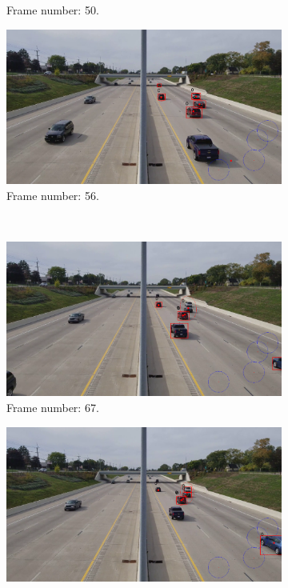 \begin{figure}[H]
\begin{subfigure}{0.48\textwidth}
        \caption{Frame number: 50.}
        \label{fig:E1-V1-S1:03}
    \end{subfigure}
    \begin{subfigure}{0.48\textwidth}
        \centering
        \includegraphics[width=\linewidth]{../../../experiments/E1/V1/YOLO/56}
        \caption{Frame number: 56.}
        \label{fig:E1-V1-S1:04}
    \end{subfigure}
    \\
    \begin{subfigure}{0.48\textwidth}
        \centering
        \includegraphics[width=\linewidth]{../../../experiments/E1/V1/YOLO/67}
        \caption{Frame number: 67.}
        \label{fig:E1-V1-S1:05}
    \end{subfigure}
    \begin{subfigure}{0.48\textwidth}
        \centering
        \includegraphics[width=\linewidth]{../../../experiments/E1/V1/YOLO/69}

\end{subfigure}
\end{figure}
